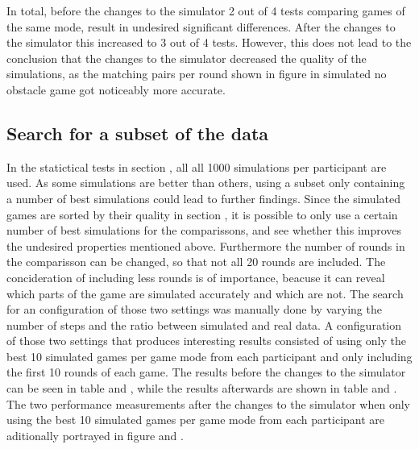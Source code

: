 In total, before the changes to the simulator 2 out of 4 tests comparing games of the same mode, result in undesired significant differences. After the changes to the simulator this increased to 3 out of 4 tests. However, this does not lead to the conclusion that the changes to the simulator decreased the quality of the simulations, as the matching pairs per round shown in figure  in simulated no obstacle game got noticeably more accurate. 

\subsection{Search for a subset of the data}
\label{search_for_a_subset}
In the statictical tests in section , all all 1000 simulations per participant are used. As some simulations are better than others, using a subset only containing a number of best simulations could lead to further findings. Since the simulated games are sorted by their quality in section , it is possible to only use a certain number of best simulations for the comparissons, and see whether this improves the undesired properties mentioned above. Furthermore the number of rounds in the comparisson can be changed, so that not all 20 rounds are included. The concideration of including less rounds is of importance, beacuse it can reveal which parts of the game are simulated accurately and which are not. The search for an configuration of those two settings was manually done by varying the number of steps and the ratio between simulated and real data. A configuration of those two settings that produces interesting results consisted of using only the best 10 simulated games per game mode from each participant and only including the first 10 rounds of each game. The results before the changes to the simulator can be seen in table  and , while the results afterwards are shown in table  and . The two performance measurements after the changes to the simulator when only using the best 10 simulated games per game mode from each participant are aditionally portrayed in figure  and .

